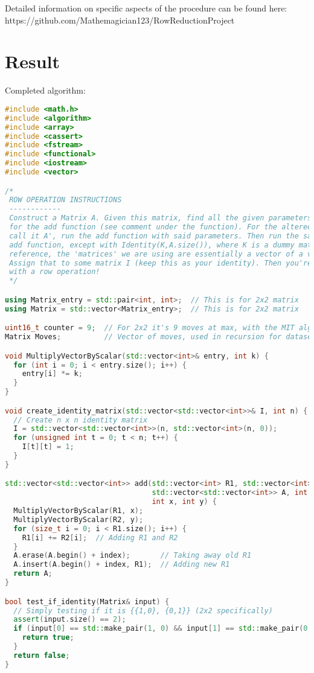 \documentclass{article}
\begin{document}
Detailed information on specific aspects of the procedure can be found here: \\ 
https://github.com/Mathemagician123/RowReductionProject
\section*{Result}
Completed algorithm:
\begin{lstlisting}[language=C++]
#include <math.h>
#include <algorithm>
#include <array>
#include <cassert>
#include <fstream>
#include <functional>
#include <iostream>
#include <vector>

/*
 ROW OPERATION INSTRUCTIONS
 ------------
 Construct a Matrix A. Given this matrix, find all the given parameters needed
 for the add function (see comment under the function). For the altered matrix,
 call it A', run the add function with said parameters. Then run the same
 add function, except with Identity(K,A.size()), where K is a dummy matrix. (For
 reference, the 'matrices' we are using are essentially a vector of a vector)
 Assign that to some matrix I (keep this as your identity). Then you're done
 with a row operation!
 */

using Matrix_entry = std::pair<int, int>;  // This is for 2x2 matrix
using Matrix = std::vector<Matrix_entry>;  // This is for 2x2 matrix

uint16_t counter = 9;  // For 2x2 it's 9 moves at max, with the MIT algorithm
Matrix Moves;          // Vector of moves, used in recursion for dataset

void MultiplyVectorByScalar(std::vector<int>& entry, int k) {
  for (int i = 0; i < entry.size(); i++) {
    entry[i] *= k;
  }
}

void create_identity_matrix(std::vector<std::vector<int>>& I, int n) {
  // Create n x n identity matrix
  I = std::vector<std::vector<int>>(n, std::vector<int>(n, 0));
  for (unsigned int t = 0; t < n; t++) {
    I[t][t] = 1;
  }
}

std::vector<std::vector<int>> add(std::vector<int> R1, std::vector<int> R2,
                                  std::vector<std::vector<int>> A, int index,
                                  int x, int y) {
  MultiplyVectorByScalar(R1, x);
  MultiplyVectorByScalar(R2, y);
  for (size_t i = 0; i < R1.size(); i++) {
    R1[i] += R2[i];  // Adding R1 and R2
  }
  A.erase(A.begin() + index);       // Taking away old R1
  A.insert(A.begin() + index, R1);  // Adding new R1
  return A;
}

bool test_if_identity(Matrix& input) {
  // Simply testing if it is {{1,0}, {0,1}} (2x2 specifically)
  assert(input.size() == 2);
  if (input[0] == std::make_pair(1, 0) && input[1] == std::make_pair(0, 1)) {
    return true;
  }
  return false;
}


\end{lstlisting}
\end{document}
